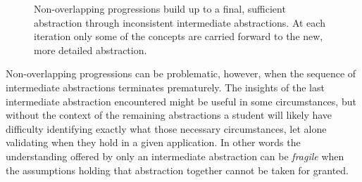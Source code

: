 \documentclass[
  letterpaper,
  DIV=11,
  numbers=noendperiod]{scrartcl}
\begin{document}
\begin{figure}
\begin{minipage}[t]{0.33\linewidth}
{{}

}

\subcaption{\label{fig-abs-incons2}}
\end{minipage}%
%
\begin{minipage}[t]{0.33\linewidth}

{\centering 


}

\subcaption{\label{fig-abs-incons3}}
\end{minipage}%

\caption{\label{fig-abs-incons}Non-overlapping progressions build up to
a final, sufficient abstraction through inconsistent intermediate
abstractions. At each iteration only some of the concepts are carried
forward to the new, more detailed abstraction.}

\end{figure}

Non-overlapping progressions can be problematic, however, when the
sequence of intermediate abstractions terminates prematurely. The
insights of the last intermediate abstraction encountered might be
useful in some circumstances, but without the context of the remaining
abstractions a student will likely have difficulty identifying exactly
what those necessary circumstances, let alone validating when they hold
in a given application. In other words the understanding offered by only
an intermediate abstraction can be \emph{fragile} when the assumptions
holding that abstraction together cannot be taken for granted.
\end{document}
